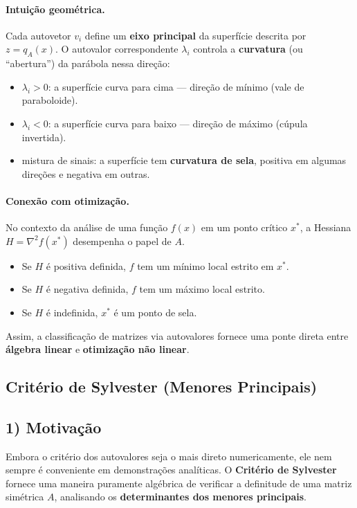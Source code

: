\documentclass[9pt,a4paper]{extarticle}
\begin{document}
\paragraph{Intui\c c\~ao geom\'etrica.}
Cada autovetor $v_i$ define um \textbf{eixo principal} da superf\'icie descrita por $z = q_A(x)$.  
O autovalor correspondente $\lambda_i$ controla a \textbf{curvatura} (ou “abertura”) da par\'abola nessa dire\c c\~ao:
\begin{itemize}
  \item $\lambda_i > 0$: a superf\'icie curva para cima — dire\c c\~ao de m\'inimo (vale de paraboloide).
  \item $\lambda_i < 0$: a superf\'icie curva para baixo — dire\c c\~ao de m\'aximo (c\'upula invertida).
  \item mistura de sinais: a superf\'icie tem \textbf{curvatura de sela}, positiva em algumas dire\c c\~oes e negativa em outras.
\end{itemize}

\paragraph{Conex\~ao com otimiza\c c\~ao.}
No contexto da an\'alise de uma fun\c c\~ao $f(x)$ em um ponto cr\'itico $x^\ast$, a Hessiana $H = \nabla^2 f(x^\ast)$ desempenha o papel de $A$.  
\begin{itemize}
  \item Se $H$ \'e positiva definida, $f$ tem um m\'inimo local estrito em $x^\ast$.
  \item Se $H$ \'e negativa definida, $f$ tem um m\'aximo local estrito.
  \item Se $H$ \'e indefinida, $x^\ast$ \'e um ponto de sela.
\end{itemize}
Assim, a classifica\c c\~ao de matrizes via autovalores fornece uma ponte direta entre \textbf{\'algebra linear} e \textbf{otimiza\c c\~ao n\~ao linear}.


\subsection{Crit\'erio de Sylvester (Menores Principais)}

\subsection*{1) Motiva\c c\~ao}
Embora o crit\'erio dos autovalores seja o mais direto numericamente, ele nem sempre \'e conveniente em demonstra\c c\~oes anal\'iticas.  
O \textbf{Crit\'erio de Sylvester} fornece uma maneira puramente alg\'ebrica de verificar a definitude de uma matriz sim\'etrica $A$, analisando os \textbf{determinantes dos menores principais}.
\end{document}
